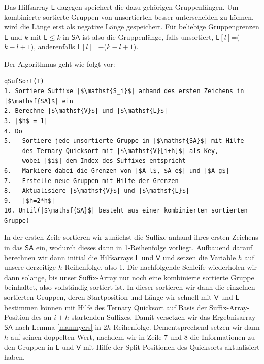 Das Hilfsarray $\mathsf{L}$ dagegen speichert die dazu gehörigen Gruppenlängen. Um kombinierte sortierte Gruppen von unsortierten besser unterscheiden zu können, wird die Länge erst als negative Länge gespeichert. Für beliebige Gruppengrenzen $\mathsf{L}$ und $k$ mit $\mathsf{L} \leq k$ in $\mathsf{SA}$ ist also die Gruppenlänge, falls unsortiert, $\mathsf{L}[l]$=($k-l+1$), anderenfalls $\mathsf{L}[l]$=$-$($k-l+1$). 

Der Algorithmus geht wie folgt vor:


\begin{verbatim}
qSufSort(T)
1. Sortiere Suffixe |$\mathsf{S_i}$| anhand des ersten Zeichens in |$\mathsf{SA}$| ein 
2. Berechne |$\mathsf{V}$| und |$\mathsf{L}$|
3. |$h$ = 1|
4. Do  
5.   Sortiere jede unsortierte Gruppe in |$\mathsf{SA}$| mit Hilfe
     des Ternary Quicksort mit |$\mathsf{V}[i+h]$| als Key,
     wobei |$i$| dem Index des Suffixes entspricht
6.   Markiere dabei die Grenzen von |$A_l$, $A_e$| und |$A_g$|
7.   Erstelle neue Gruppen mit Hilfe der Grenzen
8.   Aktualisiere |$\mathsf{V}$| und |$\mathsf{L}$|
9.   |$h=2*h$|
10. Until(|$\mathsf{SA}$| besteht aus einer kombinierten sortierten Gruppe)
\end{verbatim}

In der ersten Zeile sortieren wir zunächst die Suffixe anhand ihres ersten Zeichens in das $\mathsf{SA}$ ein, wodurch dieses dann in 1-Reihenfolge vorliegt. Aufbauend darauf berechnen wir dann initial die Hilfsarrays $\mathsf{L}$ und $\mathsf{V}$ und setzen die Variable $h$ auf unsere derzeitige $h$-Reihenfolge, also 1.
Die nachfolgende Schleife wiederholen wir dann solange, bis unser Suffix-Array nur noch eine kombinierte sortierte Gruppe beinhaltet, also vollständig sortiert ist.
In dieser sortieren wir dann die einzelnen sortierten Gruppen, deren Startposition und Länge wir schnell mit $\mathsf{V}$ und $\mathsf{L}$ bestimmen können mit Hilfe des Ternary Quicksort auf Basis der Suffix-Array-Position des an $i+h$ startenden Suffixes. Damit versetzen wir das Ergebnisarray $\mathsf{SA}$ nach Lemma \ref{manmyers} in $2h$-Reihenfolge. Dementsprechend setzen wir dann $h$ auf seinen doppelten Wert, nachdem wir in Zeile 7 und 8 die Informationen zu den Gruppen in $\mathsf{L}$ und $\mathsf{V}$ mit Hilfe der Split-Positionen des Quicksorts aktualisiert haben.

